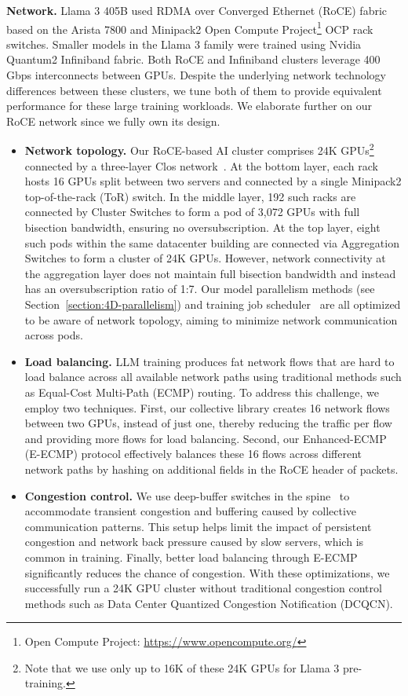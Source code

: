 \documentclass[dvipsnames]{fairmeta}
\begin{document}
\textbf{Network.}
Llama 3 405B used RDMA over Converged Ethernet (RoCE) fabric based on the Arista 7800 and Minipack2 Open Compute Project\footnote{Open Compute Project: \url{https://www.opencompute.org/}} OCP rack switches. Smaller models in the Llama 3 family were trained using Nvidia Quantum2 Infiniband fabric. Both RoCE and Infiniband clusters leverage 400 Gbps interconnects between GPUs.  Despite the underlying network technology differences between these clusters, we tune both of them to provide equivalent performance for these large training workloads. We elaborate further on our RoCE network since we fully own its design.
\begin{itemize}

    \item \textbf{Network topology.} Our RoCE-based AI cluster comprises 24K GPUs\footnote{Note that we use only up to 16K of these 24K GPUs for Llama 3 pre-training.} connected by a three-layer Clos network~\citep{lee2024building}. At the bottom layer, each rack hosts 16 GPUs split between two servers and connected by a single Minipack2 top-of-the-rack (ToR) switch. In the middle layer, 192 such racks are connected by Cluster Switches to form a pod of 3,072 GPUs with full bisection bandwidth, ensuring no oversubscription. At the top layer, eight such pods within the same datacenter building are connected via Aggregation Switches to form a cluster of 24K GPUs. However, network connectivity at the aggregation layer does not maintain full bisection bandwidth and instead has an oversubscription ratio of 1:7. Our model parallelism methods (see Section~\ref{section:4D-parallelism}) and training job scheduler~\citep{choudhury2024mast} are all optimized to be aware of network topology, aiming to minimize network communication across pods.
    
    \item \textbf{Load balancing.} LLM training produces fat network flows that are hard to load balance across all available network paths using traditional methods such as Equal-Cost Multi-Path (ECMP) routing. To address this challenge, we employ two techniques. First, our collective library creates 16 network flows between two GPUs, instead of just one, thereby reducing the traffic per flow and providing more flows for load balancing. Second, our Enhanced-ECMP (E-ECMP) protocol effectively balances these 16 flows across different network paths by hashing on additional fields in the RoCE header of packets.
    
    \item \textbf{Congestion control.} We use deep-buffer switches in the spine~\citep{gangidi2024rmda} to accommodate transient congestion and buffering caused by collective communication patterns. This setup helps limit the impact of persistent congestion and network back pressure caused by slow servers, which is common in  training. Finally, better load balancing through E-ECMP significantly reduces the chance of congestion. With these optimizations, we successfully run a 24K GPU cluster without traditional congestion control methods such as Data Center Quantized Congestion Notification (DCQCN). 
\end{itemize}
\end{document}
